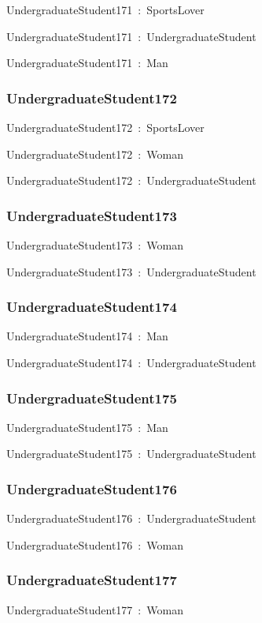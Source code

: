 \documentclass{article}
\begin{document}
UndergraduateStudent171~:~SportsLover

UndergraduateStudent171~:~UndergraduateStudent

UndergraduateStudent171~:~Man

\subsubsection*{UndergraduateStudent172}

UndergraduateStudent172~:~SportsLover

UndergraduateStudent172~:~Woman

UndergraduateStudent172~:~UndergraduateStudent

\subsubsection*{UndergraduateStudent173}

UndergraduateStudent173~:~Woman

UndergraduateStudent173~:~UndergraduateStudent

\subsubsection*{UndergraduateStudent174}

UndergraduateStudent174~:~Man

UndergraduateStudent174~:~UndergraduateStudent

\subsubsection*{UndergraduateStudent175}

UndergraduateStudent175~:~Man

UndergraduateStudent175~:~UndergraduateStudent

\subsubsection*{UndergraduateStudent176}

UndergraduateStudent176~:~UndergraduateStudent

UndergraduateStudent176~:~Woman

\subsubsection*{UndergraduateStudent177}

UndergraduateStudent177~:~Woman
\end{document}
